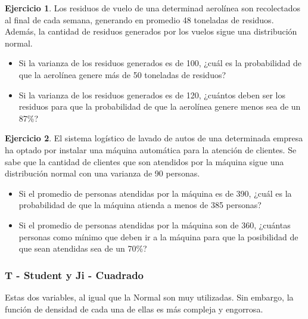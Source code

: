 \documentclass[
  11pt,
]{book}
\theoremstyle{definition}
\theoremstyle{definition}
\theoremstyle{definition}
\newtheorem{exercise}{Ejercicio}[chapter]
\theoremstyle{definition}
\theoremstyle{remark}
\begin{document}
\begin{exercise}

Los residuos de vuelo de una determinad aerolínea son recolectados al final de cada semana, generando en promedio 48 toneladas de residuos. Además, la cantidad de residuos generados por los vuelos sigue una distribución normal.

\begin{itemize}
\item
  Si la varianza de los residuos generados es de 100, ¿cuál es la probabilidad de que la aerolínea genere más de 50 toneladas de residuos?
\item
  Si la varianza de los residuos generados es de 120, ¿cuántos deben ser los residuos para que la probabilidad de que la aerolínea genere menos sea de un 87\%?
\end{itemize}

\end{exercise}

\begin{exercise}

El sistema logístico de lavado de autos de una determinada empresa ha optado por instalar una máquina automática para la atención de clientes. Se sabe que la cantidad de clientes que son atendidos por la máquina sigue una distribución normal con una varianza de 90 personas.

\begin{itemize}
\item
  Si el promedio de personas atendidas por la máquina es de 390, ¿cuál es la probabilidad de que la máquina atienda a menos de 385 personas?
\item
  Si el promedio de personas atendidas por la máquina son de 360, ¿cuántas personas como mínimo que deben ir a la máquina para que la posibilidad de que sean atendidas sea de un 70\%?
\end{itemize}

\end{exercise}

\subsubsection{T - Student y Ji - Cuadrado}\label{probabilidad-variable-aleatoria-continua-distribuciones-tstudent-chicuadrado}

Estas dos variables, al igual que la Normal son muy utilizadas. Sin embargo, la función de densidad de cada una de ellas es más compleja y engorrosa.
\end{document}
